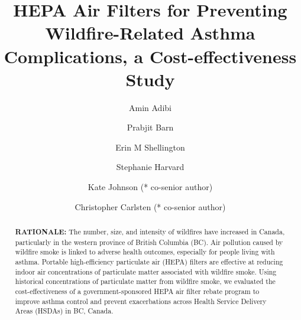 \documentclass[
  number]{elsarticle}
\begin{document}
\begin{frontmatter}
\title{HEPA Air Filters for Preventing Wildfire-Related Asthma
Complications, a Cost-effectiveness Study}
\author[1,2]{Amin Adibi%
%
}
\author[3]{Prabjit Barn%
%
}

\author[4,5]{Erin M Shellington%
%
}

\author[2]{Stephanie Harvard%
%
}

\author[1,4,5,2]{Kate Johnson (* co-senior author)%
%
}

\author[4,5,6]{Christopher Carlsten (* co-senior author)%
%
}









        
\begin{abstract}
\textbf{RATIONALE:} The number, size, and intensity of wildfires have
increased in Canada, particularly in the western province of British
Columbia (BC). Air pollution caused by wildfire smoke is linked to
adverse health outcomes, especially for people living with asthma.
Portable high-efficiency particulate air (HEPA) filters are effective at
reducing indoor air concentrations of particulate matter associated with
wildfire smoke. Using historical concentrations of particulate matter
from wildfire smoke, we evaluated the cost-effectiveness of a
government-sponsored HEPA air filter rebate program to improve asthma
control and prevent exacerbations across Health Service Delivery Areas
(HSDAs) in BC, Canada.


\end{abstract}
\end{frontmatter}
\end{document}
